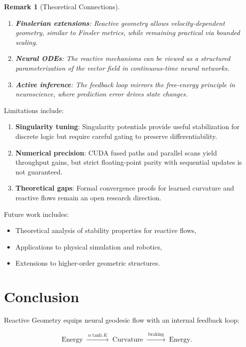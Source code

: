 \documentclass[12pt,letterpaper,twoside]{article}
\newtheorem{remarque}{Remark}[section]
\begin{document}
\begin{remarque}[Theoretical Connections]
\begin{enumerate}
\item \textbf{Finslerian extensions}: Reactive geometry allows velocity-dependent geometry, similar to Finsler metrics, while remaining practical via bounded scaling.
\item \textbf{Neural ODEs}: The reactive mechanisms can be viewed as a structured parameterization of the vector field in continuous-time neural networks.
\item \textbf{Active inference}: The feedback loop mirrors the free-energy principle in neuroscience, where prediction error drives state changes.
\end{enumerate}
\end{remarque}

Limitations include:
\begin{enumerate}
\item \textbf{Singularity tuning}: Singularity potentials provide useful stabilization for discrete logic but require careful gating to preserve differentiability.
\item \textbf{Numerical precision}: CUDA fused paths and parallel scans yield throughput gains, but strict floating-point parity with sequential updates is not guaranteed.
\item \textbf{Theoretical gaps}: Formal convergence proofs for learned curvature and reactive flows remain an open research direction.
\end{enumerate}

Future work includes:
\begin{itemize}
\item Theoretical analysis of stability properties for reactive flows,
\item Applications to physical simulation and robotics,
\item Extensions to higher-order geometric structures.
\end{itemize}

\section{Conclusion}

Reactive Geometry equips neural geodesic flow with an internal feedback loop:

\[
\boxed{\text{Energy} \;\xrightarrow{\;\alpha \tanh K\;}\; \text{Curvature} \;\xrightarrow{\;\text{braking}\;}\; \text{Energy}}.
\]
\end{document}
